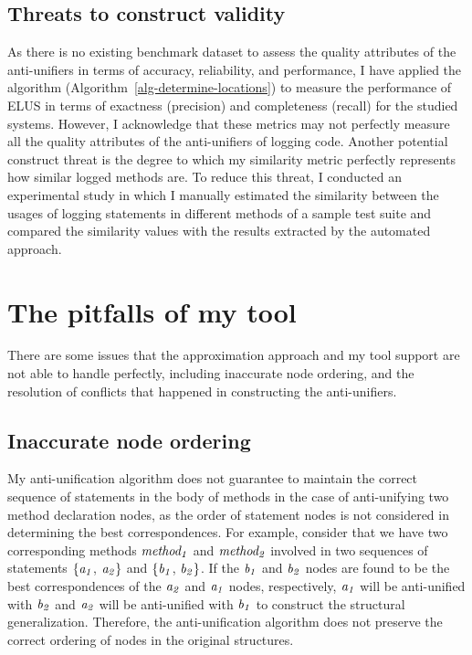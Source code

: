 \subsection{Threats to construct validity}  \label{construct_threats}
As there is no existing benchmark dataset to assess the quality attributes of the anti-unifiers in terms of accuracy, reliability, and performance, I have applied the  algorithm (Algorithm~\ref{alg-determine-locations}) to measure the performance of ELUS in terms of exactness (precision) and completeness (recall) for the studied systems. However, I acknowledge that these metrics may not perfectly measure all the quality attributes of the anti-unifiers of logging code. Another potential construct threat is the degree to which my similarity metric perfectly represents how similar logged methods are. To reduce this threat, I conducted an experimental study in which I manually estimated the similarity between the usages of logging statements in different methods of a sample test suite and compared the similarity values with the results extracted by the automated approach.



\section{The pitfalls of my tool}  \label{limitations}
There are some issues that the approximation approach and my tool support are not able to handle perfectly, including inaccurate node ordering, and the resolution of conflicts that happened in constructing the anti-unifiers.


\subsection{Inaccurate node ordering}  \label{mismatch}
My anti-unification algorithm does not guarantee to maintain the correct sequence of statements in the body of methods in the case of anti-unifying two method declaration nodes, as the order of statement nodes is not considered in determining the best correspondences. For example, consider that we have two corresponding methods $\mathit{method_1}$ and $\mathit{method_2}$ involved in two sequences of statements $\{\mathit{a_1}$, $\mathit{a_2}\}$ and $\{\mathit{b_1}$, $\mathit{b_2}\}$. If the $\mathit{b_1}$ and $\mathit{b_2}$ nodes are found to be the best correspondences of the $\mathit{a_2}$ and $\mathit{a_1}$ nodes, respectively, $\mathit{a_1}$ will be anti-unified with $\mathit{b_2}$  and $\mathit{a_2}$ will be anti-unified with $\mathit{b_1}$ to construct the structural generalization. Therefore, the anti-unification algorithm does not preserve the correct ordering of nodes in the original structures.

